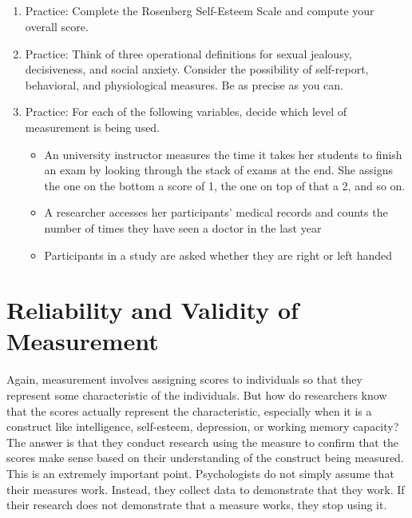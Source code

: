 \subsection{}
\begin{fullwidth}
\begin{enumerate}
\item Practice: Complete the Rosenberg Self-Esteem Scale and compute your overall score.
\item Practice: Think of three operational definitions for sexual jealousy, decisiveness, and social anxiety. Consider the possibility of self-report, behavioral, and physiological measures. Be as precise as you can.
\item Practice: For each of the following variables, decide which level of measurement is being used.
\begin{itemize}
\item An university instructor measures the time it takes her students to finish an exam by looking through the stack of exams at the end. She assigns the one on the bottom a score of 1, the one on top of that a 2, and so on.
\item A researcher accesses her participants’ medical records and counts the number of times they have seen a doctor in the last year
\item Participants in a study are asked whether they are right or left handed
\end{itemize}
\end{enumerate}
\end{fullwidth} 

 
\newpage
\section{Reliability and Validity of Measurement}


Again, measurement involves assigning scores to individuals so that they represent some characteristic of the individuals. But how do researchers know that the scores actually represent the characteristic, especially when it is a construct like intelligence, self-esteem, depression, or working memory capacity? The answer is that they conduct research using the measure to confirm that the scores make sense based on their understanding of the construct being measured. This is an extremely important point. Psychologists do not simply assume that their measures work. Instead, they collect data to demonstrate that they work. If their research does not demonstrate that a measure works, they stop using it.


